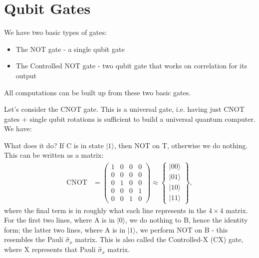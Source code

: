 \documentclass[a4paper, 11pt, normalem]{report}
\begin{document}
\section{Qubit Gates}
We have two basic types of gates:
\begin{itemize}
    \item The NOT gate - a single qubit gate
    \item The Controlled NOT gate - two qubit gate that works on correlation for its output
\end{itemize}
All computations can be built up from these two basic gates.

Let's consider the CNOT gate.
This is a universal gate, i.e. having just CNOT gates $+$ single qubit rotations is sufficient to build a universal quantum computer.
We have:
\begin{figure}[H]
    \centering
\end{figure}
What does it do?
If C is in state $|1\rangle$, then NOT on T, otherwise we do nothing.
This can be written as a matrix:
\begin{align}
    \text{CNOT} &= \begin{pmatrix} 1 & 0 & 0 & 0 \\ 0 & 0 & 0 & 0 \\ 0 & 1 & 0 & 0 \\ 0 & 0 & 0 & 1 \\ 0 & 0 & 1 & 0 \end{pmatrix} \approx \begin{Bmatrix} |00\rangle \\ |01\rangle \\ |10\rangle \\ |11\rangle\end{Bmatrix},
\end{align}
where the final term is in roughly what each line represents in the $4\times4$ matrix.
For the first two lines, where A is in $|0\rangle$, we do nothing to B, hence the identity form; the latter two lines, where A is in $|1\rangle$, we perform NOT on B - this resembles the Pauli $\hat{\sigma}_x$ matrix.
This is also called the Controlled-X (CX) gate, where X represents that Pauli $\hat{\sigma}_x$ matrix.
\end{document}
